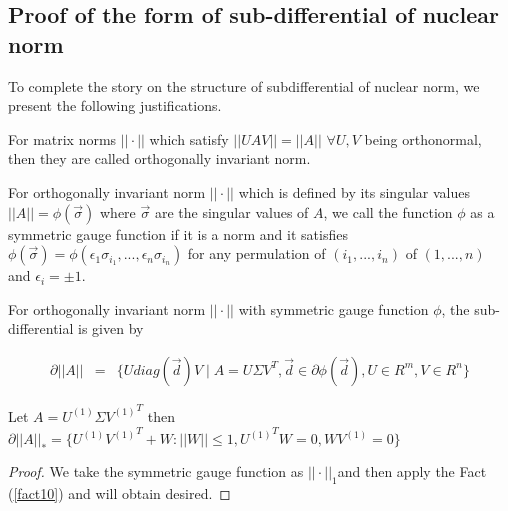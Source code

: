 \subsection{Proof of the form of sub-differential of nuclear norm } \label{sub:nuclearnorm}
To complete the story on the structure of subdifferential of nuclear norm, we present the following justifications.
\begin{definition}
For matrix norms $||\cdot||$ which satisfy $||UAV||=||A||$ $\forall U,V$ being orthonormal, then they are called orthogonally invariant norm.

\begin{definition}
For orthogonally invariant norm $||\cdot||$ which is defined by its singular values $||A||=\phi(\vec{\sigma})$ where $\vec{\sigma}$ are the singular values of $A$, we call the function $\phi$ as a symmetric gauge function if it is a norm and it satisfies $\phi(\vec{\sigma})=\phi(\epsilon_{1}\sigma_{i_{1}},...,\epsilon_{n}\sigma_{i_{n}})$ for any permulation of $(i_{1},...,i_{n})$ of $(1,...,n)$ and $\epsilon_{i}=\pm1$.

\begin{fact}
\label{fact10}
For orthogonally invariant norm $||\cdot||$ with symmetric
gauge function $\phi$, the sub-differential is given by

\begin{eqnarray*}
\partial||A|| & = & \{Udiag(\vec{d})V\mid A=U\Sigma V^{T},\vec{d}\in\partial\phi(\vec{d}),U\in R^{m},V\in R^{n}\}
\end{eqnarray*}

\end{fact}
\end{definition}
\end{definition}

\begin{thm}
Let $A=U^{(1)}\Sigma{V^{(1)}}^{T}$ then $\partial||A||_{*}=\{U^{(1)}{V^{(1)}}^{T}+W:||W||\le1,{U^{(1)}}^{T}W=0,WV^{(1)}=0\}$
\end{thm}

\begin{proof}
We take the symmetric gauge function as $||\cdot||_{1}$and then apply the Fact (\ref{fact10}) and will obtain desired.
\end{proof}

